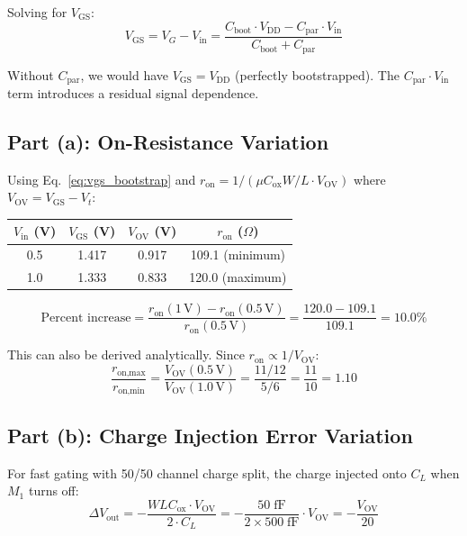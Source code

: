 \documentclass{article}
\begin{document}
Solving for $V_\text{GS}$:
\begin{equation}
    V_\text{GS} = V_G - V_\text{in} = \frac{C_\text{boot} \cdot V_\text{DD} - C_\text{par} \cdot V_\text{in}}{C_\text{boot} + C_\text{par}}
    \label{eq:vgs_bootstrap}
\end{equation}

Without $C_\text{par}$, we would have $V_\text{GS} = V_\text{DD}$ (perfectly bootstrapped). The $C_\text{par} \cdot V_\text{in}$ term introduces a residual signal dependence.

\subsection{Part (a): On-Resistance Variation}

Using Eq.~\eqref{eq:vgs_bootstrap} and $r_\text{on} = 1/(\mu C_\text{ox} W/L \cdot V_\text{OV})$ where $V_\text{OV} = V_\text{GS} - V_t$:

\begin{table}[H]
\centering
\begin{tabular}{@{}cccc@{}}
\toprule
$V_\text{in}$ (V) & $V_\text{GS}$ (V) & $V_\text{OV}$ (V) & $r_\text{on}$ ($\Omega$) \\
\midrule
0.5 & 1.417 & 0.917 & 109.1 (minimum) \\
1.0 & 1.333 & 0.833 & 120.0 (maximum) \\
\bottomrule
\end{tabular}
\end{table}

\begin{equation}
    \boxed{\text{Percent increase} = \frac{r_\text{on}(1\,\text{V}) - r_\text{on}(0.5\,\text{V})}{r_\text{on}(0.5\,\text{V})} = \frac{120.0 - 109.1}{109.1} = 10.0\%}
\end{equation}

This can also be derived analytically. Since $r_\text{on} \propto 1/V_\text{OV}$:
\begin{equation}
    \frac{r_\text{on,max}}{r_\text{on,min}} = \frac{V_\text{OV}(0.5\,\text{V})}{V_\text{OV}(1.0\,\text{V})} = \frac{11/12}{5/6} = \frac{11}{10} = 1.10
\end{equation}

\subsection{Part (b): Charge Injection Error Variation}

For fast gating with 50/50 channel charge split, the charge injected onto $C_L$ when $M_1$ turns off:
\begin{equation}
    \Delta V_\text{out} = -\frac{WLC_\text{ox} \cdot V_\text{OV}}{2 \cdot C_L} = -\frac{50\;\text{fF}}{2 \times 500\;\text{fF}} \cdot V_\text{OV} = -\frac{V_\text{OV}}{20}
\end{equation}
\end{document}
